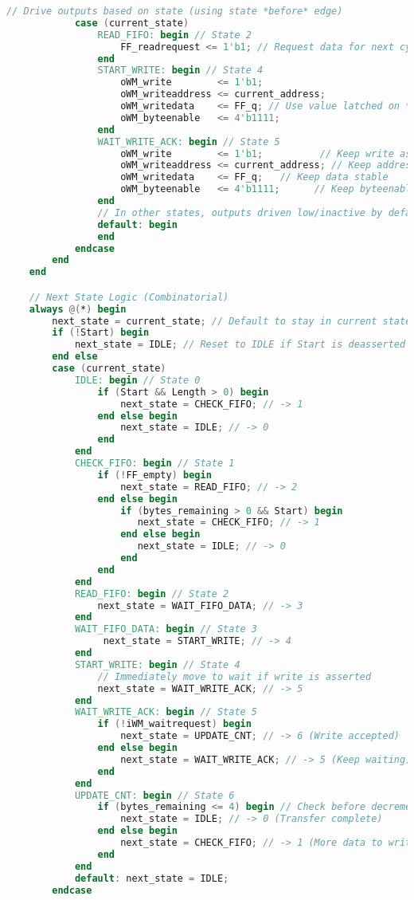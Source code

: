 \begin{lstlisting}[language=Verilog, caption={WRITE\_MASTER.v - Avalon Write Master Module}, label=lst:verilog_writemaster]
            // Drive outputs based on state (using state *before* edge)
            case (current_state)
                READ_FIFO: begin // State 2
                    FF_readrequest <= 1'b1; // Request data for next cycle
                end
                START_WRITE: begin // State 4
                    oWM_write        <= 1'b1;
                    oWM_writeaddress <= current_address;
                    oWM_writedata    <= FF_q; // Use value latched on *previous* edge
                    oWM_byteenable   <= 4'b1111;
                end
                WAIT_WRITE_ACK: begin // State 5
                    oWM_write        <= 1'b1;          // Keep write asserted
                    oWM_writeaddress <= current_address; // Keep address stable
                    oWM_writedata    <= FF_q;   // Keep data stable
                    oWM_byteenable   <= 4'b1111;      // Keep byteenable asserted
                end
                // In other states, outputs driven low/inactive by defaults above
                default: begin
                end
            endcase
        end
    end

    // Next State Logic (Combinatorial)
    always @(*) begin
        next_state = current_state; // Default to stay in current state
        if (!Start) begin
            next_state = IDLE; // Reset to IDLE if Start is deasserted
        end else
        case (current_state)
            IDLE: begin // State 0
                if (Start && Length > 0) begin
                    next_state = CHECK_FIFO; // -> 1
                end else begin
                    next_state = IDLE; // -> 0
                end
            end
            CHECK_FIFO: begin // State 1
                if (!FF_empty) begin
                    next_state = READ_FIFO; // -> 2
                end else begin
                    if (bytes_remaining > 0 && Start) begin
                       next_state = CHECK_FIFO; // -> 1
                    end else begin
                       next_state = IDLE; // -> 0
                    end
                end
            end
            READ_FIFO: begin // State 2
                next_state = WAIT_FIFO_DATA; // -> 3
            end
            WAIT_FIFO_DATA: begin // State 3
                 next_state = START_WRITE; // -> 4
            end
            START_WRITE: begin // State 4
                // Immediately move to wait if write is asserted
                next_state = WAIT_WRITE_ACK; // -> 5
            end
            WAIT_WRITE_ACK: begin // State 5
                if (!iWM_waitrequest) begin
                    next_state = UPDATE_CNT; // -> 6 (Write accepted)
                end else begin
                    next_state = WAIT_WRITE_ACK; // -> 5 (Keep waiting)
                end
            end
            UPDATE_CNT: begin // State 6
                if (bytes_remaining <= 4) begin // Check before decrement
                    next_state = IDLE; // -> 0 (Transfer complete)
                end else begin
                    next_state = CHECK_FIFO; // -> 1 (More data to write)
                end
            end
            default: next_state = IDLE;
        endcase


\end{lstlisting}
